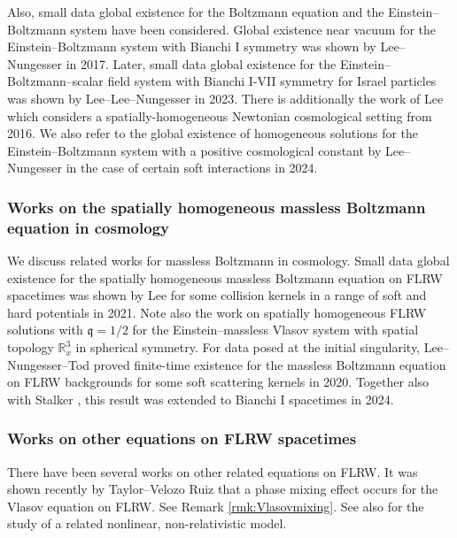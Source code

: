 \documentclass[reqno]{amsart}
\def\R{\mathbb R}
\newcommand{\qq}{\mathfrak{q}}
\theoremstyle{definition}
\numberwithin{equation}{section}
\numberwithin{theorem}{section}
\begin{document}
Also, small data global existence for the Boltzmann equation and the Einstein--Boltzmann system have been considered. Global existence near vacuum for the Einstein--Boltzmann system with Bianchi I symmetry was shown by Lee--Nungesser \cite{MR3620020} in 2017. Later, small data global existence for the Einstein--Boltzmann--scalar field system with Bianchi I-VII symmetry for Israel particles was shown by Lee--Lee--Nungesser \cite{LeeLeeNungesser2023} in 2023.  There is additionally the work of Lee which considers a spatially-homogeneous Newtonian cosmological setting \cite{LeeHo2016} from 2016.  We also refer to the global existence of homogeneous solutions for the Einstein--Boltzmann system with a positive cosmological constant by Lee--Nungesser \cite{LeeNungesser2024} in the case of certain soft interactions in 2024. 





\subsubsection{Works on the spatially homogeneous massless Boltzmann equation in cosmology}

We discuss related works for massless Boltzmann in cosmology. Small data global existence for the spatially homogeneous massless Boltzmann equation on FLRW spacetimes was shown by Lee \cite{Lee2021} for some collision kernels in a range of soft and hard potentials in 2021. Note also the work \cite{Taylor2024} on spatially homogeneous FLRW solutions with \(\qq =1/2\) for the Einstein--massless Vlasov system with spatial topology \(\R^3_x\) in spherical symmetry. For data posed at the initial singularity, Lee--Nungesser--Tod \cite{MR4063736} proved finite-time existence for the massless Boltzmann equation on FLRW backgrounds for some soft scattering kernels in 2020. Together also with Stalker \cite{LeeNungesserStalkerTod2024}, this result was extended to Bianchi I spacetimes in 2024.

\subsubsection{Works on other equations on FLRW spacetimes}

There have been several works on other related equations on FLRW.  It was shown recently by Taylor--Velozo Ruiz \cite{TaylorVelozo2025} that a phase mixing effect occurs for the Vlasov equation on FLRW.  See Remark \ref{rmk:Vlasovmixing}. See also \cite{FajmanUrban2026} for the study of a related nonlinear, non-relativistic model.
\end{document}
